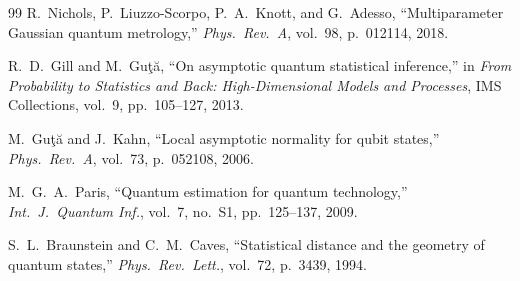 \documentclass[journal]{IEEEtran}
\begin{document}
\begin{thebibliography}{99}
R.~Nichols, P.~Liuzzo-Scorpo, P.~A.~Knott, and G.~Adesso, ``Multiparameter Gaussian quantum metrology,'' \textit{Phys.\ Rev.\ A}, vol.~98, p.~012114, 2018.

R.~D.~Gill and M.~Gu\c{t}\u{a}, ``On asymptotic quantum statistical inference,'' in \textit{From Probability to Statistics and Back: High-Dimensional Models and Processes}, IMS Collections, vol.~9, pp.~105--127, 2013.

M.~Gu\c{t}\u{a} and J.~Kahn, ``Local asymptotic normality for qubit states,'' \textit{Phys.\ Rev.\ A}, vol.~73, p.~052108, 2006.

M.~G.~A.~Paris, ``Quantum estimation for quantum technology,'' \textit{Int.\ J.\ Quantum Inf.}, vol.~7, no.~S1, pp.~125--137, 2009.

S.~L.~Braunstein and C.~M.~Caves, ``Statistical distance and the geometry of quantum states,'' \textit{Phys.\ Rev.\ Lett.}, vol.~72, p.~3439, 1994.

\end{thebibliography}
\end{document}
